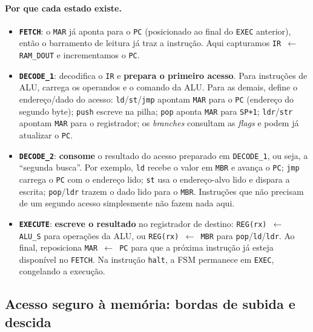 \documentclass[12pt,a4paper]{article}
\begin{document}
\paragraph{Por que cada estado existe.}
\begin{itemize}
    \item \textbf{\texttt{FETCH}}: o \texttt{MAR} já aponta para o \texttt{PC} (posicionado
          ao final do \texttt{EXEC} anterior), então o barramento de leitura já traz a
          instrução. Aqui capturamos \texttt{IR $\leftarrow$ RAM\_DOUT} e incrementamos o
          \texttt{PC}.
    \item \textbf{\texttt{DECODE\_1}}: decodifica o \texttt{IR} e \textbf{prepara o primeiro
          acesso}. Para instruções de ALU, carrega os operandos e o comando da ALU. Para as
          demais, define o endereço/dado do acesso: \texttt{ld}/\texttt{st}/\texttt{jmp}
          apontam \texttt{MAR} para o \texttt{PC} (endereço do segundo byte); \texttt{push}
          escreve na pilha; \texttt{pop} aponta \texttt{MAR} para \texttt{SP+1};
          \texttt{ldr}/\texttt{str} apontam \texttt{MAR} para o registrador; os
          \textit{branches} consultam as \textit{flags} e podem já atualizar o \texttt{PC}.
    \item \textbf{\texttt{DECODE\_2}}: \textbf{consome} o resultado do acesso preparado em
          \texttt{DECODE\_1}, ou seja, a ``segunda busca''. Por exemplo, \texttt{ld} recebe o
          valor em \texttt{MBR} e avança o \texttt{PC}; \texttt{jmp} carrega o \texttt{PC}
          com o endereço lido; \texttt{st} usa o endereço-alvo lido e dispara a escrita;
          \texttt{pop}/\texttt{ldr} trazem o dado lido para o \texttt{MBR}. Instruções que
          não precisam de um segundo acesso simplesmente não fazem nada aqui.
    \item \textbf{\texttt{EXECUTE}}: \textbf{escreve o resultado} no registrador de destino:
          \texttt{REG(rx) $\leftarrow$ ALU\_S} para operações da ALU, ou
          \texttt{REG(rx) $\leftarrow$ MBR} para \texttt{pop}/\texttt{ld}/\texttt{ldr}. Ao
          final, reposiciona \texttt{MAR $\leftarrow$ PC} para que a próxima instrução já
          esteja disponível no \texttt{FETCH}. Na instrução \texttt{halt}, a FSM permanece
          em \texttt{EXEC}, congelando a execução.
\end{itemize}

\subsection{Acesso seguro à memória: bordas de subida e descida}
\label{sec:memacc}
\end{document}
